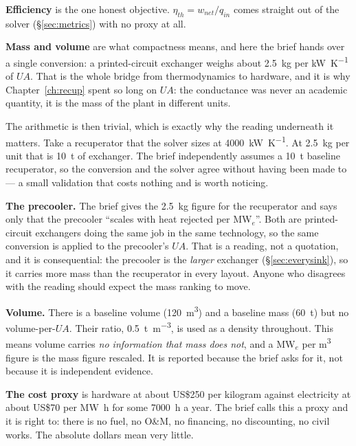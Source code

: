 \documentclass[11pt,a4paper]{report}
\begin{document}
\textbf{Efficiency} is the one honest objective. $\eta_{th} = w_{net}/q_{in}$
comes straight out of the solver (\S\ref{sec:metrics}) with no proxy at all.

\textbf{Mass and volume} are what compactness means, and here the brief
hands over a single conversion: a printed-circuit exchanger weighs about
\SI{2.5}{\kilo\gram} per \si{\kilo\watt\per\kelvin} of $UA$. That is the
whole bridge from thermodynamics to hardware, and it is why
Chapter~\ref{ch:recup} spent so long on $UA$: the conductance was never an
academic quantity, it is the mass of the plant in different units.

The arithmetic is then trivial, which is exactly why the reading underneath
it matters. Take a recuperator that the solver sizes at
\SI{4000}{\kilo\watt\per\kelvin}. At \SI{2.5}{\kilo\gram} per unit that is
\SI{10}{\tonne} of exchanger. The brief independently assumes a
\SI{10}{\tonne} baseline recuperator, so the conversion and the solver agree
without having been made to --- a small validation that costs nothing and is
worth noticing.

\begin{caveat}[title={Caveat: two readings the brief does not settle}]
\textbf{The precooler.} The brief gives the \SI{2.5}{\kilo\gram} figure for
the recuperator and says only that the precooler ``scales with heat rejected
per \si{\mega\watt}$_e$''. Both are printed-circuit exchangers doing the
same job in the same technology, so the same conversion is applied to the
precooler's $UA$. That is a reading, not a quotation, and it is consequential:
the precooler is the \emph{larger} exchanger
(\S\ref{sec:everysink}), so it carries more mass than the recuperator in
every layout. Anyone who disagrees with the reading should expect the
mass ranking to move.

\textbf{Volume.} There is a baseline volume (\SI{120}{\cubic\metre}) and a
baseline mass (\SI{60}{\tonne}) but no volume-per-$UA$. Their ratio,
\SI{0.5}{\tonne\per\cubic\metre}, is used as a density throughout. This
means volume carries \emph{no information that mass does not}, and a
\si{\mega\watt}$_e$ per \si{\cubic\metre} figure is the mass figure
rescaled. It is reported because the brief asks for it, not because it is
independent evidence.
\end{caveat}

\textbf{The cost proxy} is hardware at about US\$250 per kilogram
against electricity at about US\$70 per \si{\mega\watt\hour} for
some \SI{7000}{\hour} a year. The brief calls this a proxy and it is right
to: there is no fuel, no O\&M, no financing, no discounting, no civil works.
The absolute dollars mean very little.
\end{document}
